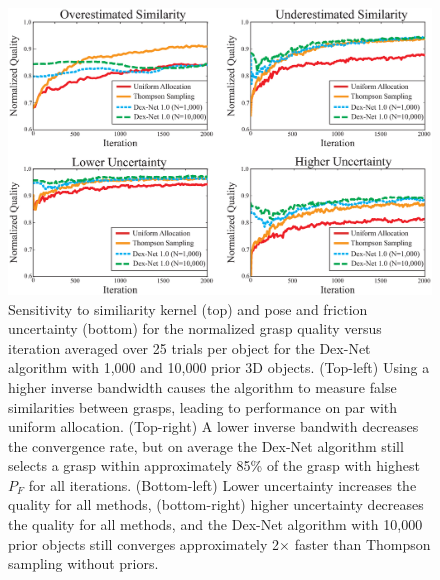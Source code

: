 \begin{figure}[t!]
\centering
\includegraphics[scale=0.21]{figures/illustrations/combined_weight_and_u_sensitivity.eps}
\caption{Sensitivity to similiarity kernel (top) and pose and friction uncertainty (bottom) for the normalized grasp quality versus iteration averaged over 25 trials per object for the Dex-Net algorithm with 1,000 and 10,000 prior 3D objects.
(Top-left) Using a higher inverse bandwidth causes the algorithm to measure false similarities between grasps, leading to performance on par with uniform allocation.
(Top-right) A lower inverse bandwith decreases the convergence rate, but on average the Dex-Net algorithm still selects a grasp within approximately 85\% of the grasp with highest $P_F$ for all iterations.
(Bottom-left) Lower uncertainty increases the quality for all methods, (bottom-right) higher uncertainty decreases the quality for all methods, and the Dex-Net algorithm with 10,000 prior objects still converges approximately 2$\times$ faster than Thompson sampling without priors. 
}
\vspace*{-15pt}
\end{figure}